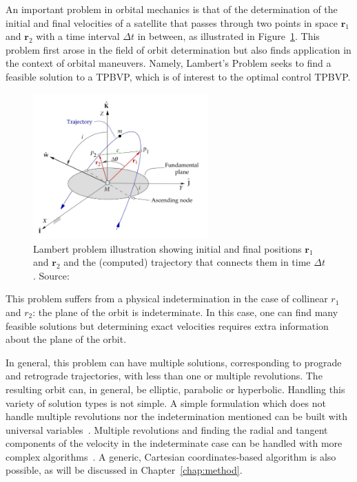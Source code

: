 An important problem in orbital mechanics is that of the determination of the initial and final velocities of a satellite that passes through two points in space \(\mathbf{r}_1\) and \(\mathbf{r}_2\) with a time interval \(\Delta t\) in between, as illustrated in Figure~\ref{fig:lambert_diagram}. This problem first arose in the field of orbit determination but also finds application in the context of orbital maneuvers. Namely, Lambert's Problem seeks to find a feasible solution to a TPBVP, which is of interest to the optimal control TPBVP. 

\begin{figure}[htbp]
    \centering
    \includegraphics[width=0.6\textwidth]{img/lambert_from_curtis.png}
    \caption{Lambert problem illustration showing initial and final positions \(\mathbf{r}_1\) and \(\mathbf{r}_2\) and the (computed) trajectory that connects them in time \(\Delta t\). Source: \cite{curtis2015orbital}}
    \label{fig:lambert_diagram}
\end{figure}

This problem suffers from a physical indetermination in the case of collinear \(r_1\) and \(r_2\): the plane of the orbit is indeterminate. In this case, one can find many feasible solutions but determining exact velocities requires extra information about the plane of the orbit.\

In general, this problem can have multiple solutions, corresponding to prograde and retrograde trajectories, with less than one or multiple revolutions. The resulting orbit can, in general, be elliptic, parabolic or hyperbolic. Handling this variety of solution types is not simple. A simple formulation which does not handle multiple revolutions nor the indetermination mentioned can be built with universal variables~\cite{curtis2015orbital}. Multiple revolutions and finding the radial and tangent components of the velocity in the indeterminate case can be handled with more complex algorithms~\cite{sukhanov}. A generic, Cartesian coordinates-based algorithm is also possible, as will be discussed in Chapter~\ref{chap:method}.

